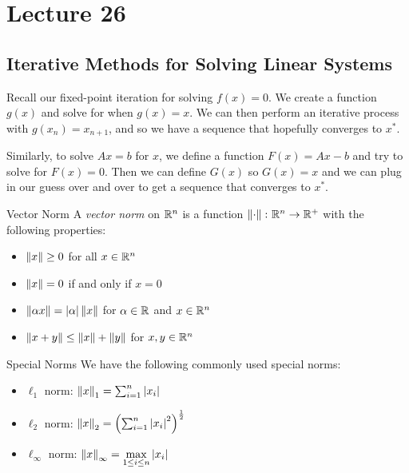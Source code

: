 \documentclass[class=article, crop=false]{standalone}
\begin{document}
  \section{Lecture 26}
  \subsection{Iterative Methods for Solving Linear Systems}
  Recall our fixed-point iteration for solving $f(x) = 0$. We create a function $g(x)$ and solve for when $g(x) = x$. We can then perform an iterative process with $g(x_n) = x_{n + 1}$, and so we have a sequence that hopefully converges to $x^*$. \par
  Similarly, to solve $Ax = b$ for $x$, we define a function $F(x) = Ax - b$ and try to solve for $F(x) = 0$. Then we can define $G(x)$ so $G(x) = x$ and we can plug in our guess over and over to get a sequence that converges to $x^*$.
  \begin{definition}{Vector Norm}
    A \emph{vector norm} on $\mathbb{R}^n$ is a function $\left\lVert \cdot\right\rVert\colon \mathbb{R}^n\to \mathbb{R}^+$ with the following properties:
    \begin{itemize}
      \item $\left\lVert x\right\rVert \geq 0$ for all $x\in \mathbb{R}^n$
      \item $\left\lVert x\right\rVert = 0$ if and only if $x = 0$
      \item $\left\lVert \alpha x\right\rVert = \left\lvert \alpha \right\rvert\left\lVert x\right\rVert$ for $\alpha\in\mathbb{R}$ and $x\in\mathbb{R}^n$
      \item $\left\lVert x + y\right\rVert \leq \left\lVert x\right\rVert + \left\lVert y\right\rVert$ for $x, y\in\mathbb{R}^n$
    \end{itemize}
  \end{definition}
  \begin{definition}{Special Norms}
    We have the following commonly used special norms:
    \begin{itemize}
      \item $\ell_1$ norm: $\left\lVert x\right\rVert_1 = \sum_{i=1}^{n} \left\lvert x_i \right\rvert$
      \item $\ell_2$ norm: $\left\lVert x\right\rVert_2 = \left( \sum_{i=1}^{n} \left\lvert x_i \right\rvert^2 \right)^{\frac{1}{2}}$
      \item $\ell_\infty$ norm: $\left\lVert x\right\rVert_\infty = \max\limits_{1 \leq i \leq n}\left\lvert x_i \right\rvert$
    \end{itemize}
  \end{definition}
\end{document}
